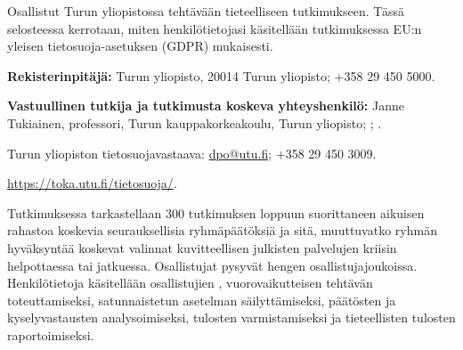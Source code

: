 
\renewcommand{\StudyTitle}{\StudyTitleFI}
\setlength{\emergencystretch}{2em}


Osallistut Turun yliopistossa tehtävään tieteelliseen tutkimukseen. Tässä selosteessa kerrotaan, miten henkilötietojasi käsitellään tutkimuksessa \emph{\StudyTitleFI} EU:n yleisen tietosuoja-asetuksen (GDPR) mukaisesti.

\textbf{Rekisterinpitäjä:} Turun yliopisto, 20014 Turun yliopisto; +358 29 450 5000.

\textbf{Vastuullinen tutkija ja tutkimusta koskeva yhteyshenkilö:} Janne Tukiainen, professori, Turun kauppakorkeakoulu, Turun yliopisto; \StudyEmail; \StudyPhone.

Turun yliopiston tietosuojavastaava: \href{mailto:dpo@utu.fi}{dpo@utu.fi}; +358 29 450 3009.

\url{https://toka.utu.fi/tietosuoja/}.

Tutkimuksessa tarkastellaan 300 tutkimuksen loppuun suorittaneen aikuisen rahastoa koskevia seurauksellisia ryhmäpäätöksiä ja sitä, muuttuvatko ryhmän hyväksyntää koskevat valinnat kuvitteellisen julkisten palvelujen kriisin helpottaessa tai jatkuessa. Osallistujat pysyvät  hengen osallistujajoukoissa. Henkilötietoja käsitellään osallistujien , vuorovaikutteisen tehtävän toteuttamiseksi, satunnaistetun asetelman säilyttämiseksi, päätösten ja kyselyvastausten analysoimiseksi, tulosten varmistamiseksi ja tieteellisten tulosten raportoimiseksi. 

